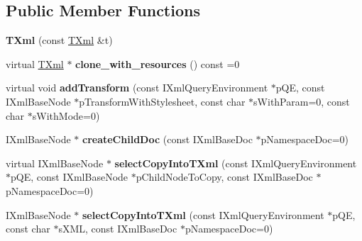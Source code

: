 \subsection*{\-Public \-Member \-Functions}
\begin{DoxyCompactItemize}
\item 
\hypertarget{classgeneral__server_1_1TXml_ae36aa28a46429eb57735868c5544892e}{{\bfseries \-T\-Xml} (const \hyperlink{classgeneral__server_1_1TXml}{\-T\-Xml} \&t)}\label{classgeneral__server_1_1TXml_ae36aa28a46429eb57735868c5544892e}

\item 
\hypertarget{classgeneral__server_1_1TXml_a6c3bcd9aebf02b681593de1e41fff472}{virtual \hyperlink{classgeneral__server_1_1TXml}{\-T\-Xml} $\ast$ {\bfseries clone\-\_\-with\-\_\-resources} () const =0}\label{classgeneral__server_1_1TXml_a6c3bcd9aebf02b681593de1e41fff472}

\item 
\hypertarget{classgeneral__server_1_1TXml_aaed29f3cea500afff70456ac6fe2a43d}{virtual void {\bfseries add\-Transform} (const \-I\-Xml\-Query\-Environment $\ast$p\-Q\-E, const \-I\-Xml\-Base\-Node $\ast$p\-Transform\-With\-Stylesheet, const char $\ast$s\-With\-Param=0, const char $\ast$s\-With\-Mode=0)}\label{classgeneral__server_1_1TXml_aaed29f3cea500afff70456ac6fe2a43d}

\item 
\hypertarget{classgeneral__server_1_1TXml_a8bdc972466636778ac1b7caa528fee9c}{\-I\-Xml\-Base\-Node $\ast$ {\bfseries create\-Child\-Doc} (const \-I\-Xml\-Base\-Doc $\ast$p\-Namespace\-Doc=0)}\label{classgeneral__server_1_1TXml_a8bdc972466636778ac1b7caa528fee9c}

\item 
\hypertarget{classgeneral__server_1_1TXml_aa4912ed3ad5bda75f70c436a1388b77f}{virtual \-I\-Xml\-Base\-Node $\ast$ {\bfseries select\-Copy\-Into\-T\-Xml} (const \-I\-Xml\-Query\-Environment $\ast$p\-Q\-E, const \-I\-Xml\-Base\-Node $\ast$p\-Child\-Node\-To\-Copy, const \-I\-Xml\-Base\-Doc $\ast$p\-Namespace\-Doc=0)}\label{classgeneral__server_1_1TXml_aa4912ed3ad5bda75f70c436a1388b77f}

\item 
\hypertarget{classgeneral__server_1_1TXml_ac907e0c84f971716ad40386d3a8fa023}{\-I\-Xml\-Base\-Node $\ast$ {\bfseries select\-Copy\-Into\-T\-Xml} (const \-I\-Xml\-Query\-Environment $\ast$p\-Q\-E, const char $\ast$s\-X\-M\-L, const \-I\-Xml\-Base\-Doc $\ast$p\-Namespace\-Doc=0)}\label{classgeneral__server_1_1TXml_ac907e0c84f971716ad40386d3a8fa023}


\end{DoxyCompactItemize}
